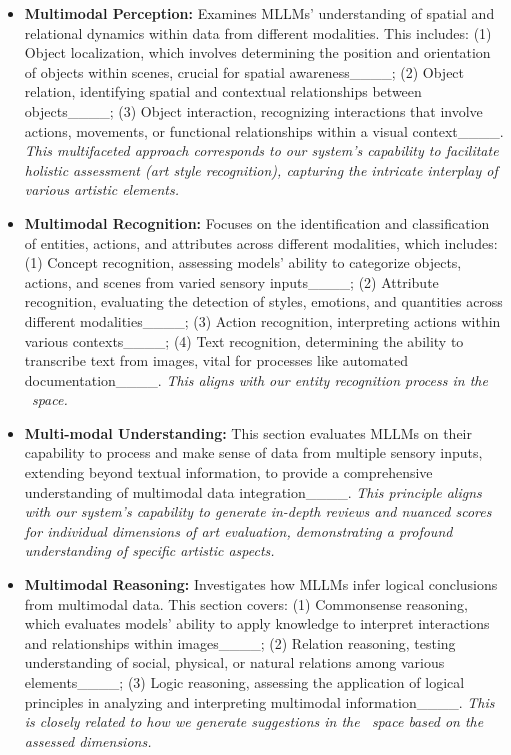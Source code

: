 \begin{itemize}[leftmargin=*]
    \item \textbf{Multimodal Perception:} Examines MLLMs' understanding of spatial and relational dynamics within data from different modalities. This includes: 
    (1) Object localization, which involves determining the position and orientation of objects within scenes, crucial for spatial awareness____; 
    (2) Object relation, identifying spatial and contextual relationships between objects____; 
    (3) Object interaction, recognizing interactions that involve actions, movements, or functional relationships within a visual context____. \textit{This multifaceted approach corresponds to our system's capability to facilitate holistic assessment (art style recognition), capturing the intricate interplay of various artistic elements.}
    

    \item \textbf{Multimodal Recognition:} Focuses on the identification and classification of entities, actions, and attributes across different modalities, which includes: 
    (1) Concept recognition, assessing models' ability to categorize objects, actions, and scenes from varied sensory inputs____; 
    (2) Attribute recognition, evaluating the detection of styles, emotions, and quantities across different modalities____; 
    (3) Action recognition, interpreting actions within various contexts____; 
    (4) Text recognition, determining the ability to transcribe text from images, vital for processes like automated documentation____. \textit{This aligns with our entity recognition process in the \dataset~space.}
    
    \item \textbf{Multi-modal Understanding:} This section evaluates MLLMs on their capability to process and make sense of data from multiple sensory inputs, extending beyond textual information, to provide a comprehensive understanding of multimodal data integration____. \textit{This principle aligns with our system's capability to generate in-depth reviews and nuanced scores for individual dimensions of art evaluation, demonstrating a profound understanding of specific artistic aspects.}
    
    \item \textbf{Multimodal Reasoning:} Investigates how MLLMs infer logical conclusions from multimodal data. This section covers:
    (1) Commonsense reasoning, which evaluates models' ability to apply knowledge to interpret interactions and relationships within images____;
    (2) Relation reasoning, testing understanding of social, physical, or natural relations among various elements____;
    (3) Logic reasoning, assessing the application of logical principles in analyzing and interpreting multimodal information____. \textit{This is closely related to how we generate suggestions in the \dataset~space based on the assessed dimensions.}
\end{itemize}
